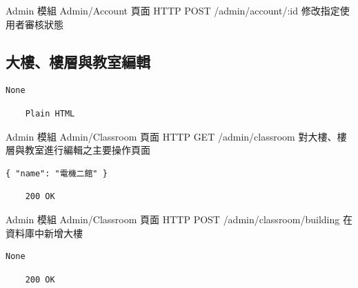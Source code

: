 \documentclass{article}
\begin{document}
{Admin 模組}
{Admin/Account 頁面}
{HTTP POST}
{/admin/account/:id}
{修改指定使用者審核狀態}

\pagebreak

\subsection{大樓、樓層與教室編輯}

\begin{lrbox}{\jsoninputbox}
	\begin{lstlisting}
None
\end{lstlisting}
\end{lrbox}

\begin{lrbox}{\jsonoutputbox}
	\begin{lstlisting}
	Plain HTML
\end{lstlisting}
\end{lrbox}

{Admin 模組}
{Admin/Classroom 頁面}
{HTTP GET}
{/admin/classroom}
{對大樓、樓層與教室進行編輯之主要操作頁面}

\bigskip

\begin{lrbox}{\jsoninputbox}
	\begin{lstlisting}[basicstyle=\footnotesize\ttfamily]
{ "name": "電機二館" }
\end{lstlisting}
\end{lrbox}

\begin{lrbox}{\jsonoutputbox}
	\begin{lstlisting}
	200 OK
\end{lstlisting}
\end{lrbox}

{Admin 模組}
{Admin/Classroom 頁面}
{HTTP POST}
{/admin/classroom/building}
{在資料庫中新增大樓}

\bigskip

\begin{lrbox}{\jsoninputbox}
	\begin{lstlisting}
None
\end{lstlisting}
\end{lrbox}

\begin{lrbox}{\jsonoutputbox}
	\begin{lstlisting}
	200 OK
\end{lstlisting}
\end{lrbox}
\end{document}
